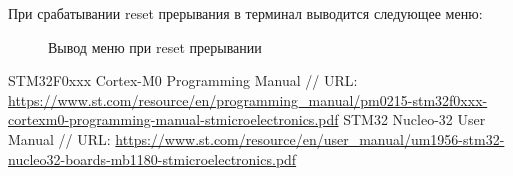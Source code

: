 При срабатывании reset прерывания в терминал выводится следующее меню:
\begin{figure}[H]
    \centering
        \caption{Вывод меню при reset прерывании}
\end{figure}




























\begin{thebibliography}{}
STM32F0xxx Cortex-M0 Programming Manual 
// URL: \url{https://www.st.com/resource/en/programming_manual/pm0215-stm32f0xxx-cortexm0-programming-manual-stmicroelectronics.pdf}
STM32 Nucleo-32 User Manual
// URL: \url{https://www.st.com/resource/en/user_manual/um1956-stm32-nucleo32-boards-mb1180-stmicroelectronics.pdf}
\end{thebibliography}


